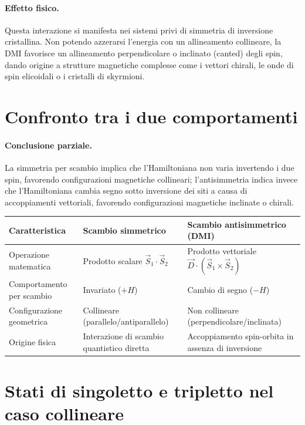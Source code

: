 \documentclass[11pt,a4paper]{article}
\begin{document}
\paragraph{Effetto fisico.} Questa interazione si manifesta nei sistemi privi di
simmetria di inversione cristallina. Non potendo azzerarsi l'energia con un
allineamento collineare, la DMI favorisce un allineamento perpendicolare o inclinato
(canted) degli spin, dando origine a strutture magnetiche complesse come i vettori
chirali, le onde di spin elicoidali o i cristalli di skyrmioni.

\section{Confronto tra i due comportamenti}

\paragraph{Conclusione parziale.} La simmetria per scambio implica che l'Hamiltoniana
non varia invertendo i due spin, favorendo configurazioni magnetiche collineari;
l'antisimmetria indica invece che l'Hamiltoniana cambia segno sotto inversione dei siti
a causa di accoppiamenti vettoriali, favorendo configurazioni magnetiche inclinate o
chirali.

\begin{center}
\begin{tabular}{@{}p{3.1cm}p{4.9cm}p{4.9cm}@{}}
\toprule
Caratteristica & Scambio simmetrico & Scambio antisimmetrico (DMI) \\
\midrule
Operazione matematica & Prodotto scalare $\vec S_1\cdot\vec S_2$ & Prodotto vettoriale $\vec D\cdot(\vec S_1\times\vec S_2)$ \\
Comportamento per scambio & Invariato ($+H$) & Cambio di segno ($-H$) \\
Configurazione geometrica & Collineare (parallelo/antiparallelo) & Non collineare (perpendicolare/inclinata) \\
Origine fisica & Interazione di scambio quantistico diretta & Accoppiamento spin-orbita in assenza di inversione \\
\bottomrule
\end{tabular}

\end{center}

\section{Stati di singoletto e tripletto nel caso collineare}
\end{document}
